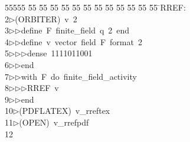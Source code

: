 %
%
\begin{tabbing}
55555 \= 55 \= 55 \= 55 \= 55 \= 55 \= 55 \= 55 \= 55 \= 55 \= 55 \= 55 \= 55 \= \>RREF:\\[0pt]
2\>$\triangleright$\>(ORBITER)\ v\ 2\ \\[0pt]
3\>$\triangleright$\>$\triangleright$\>define\ F\ finite\_field\ q\ 2\ end\ \\[0pt]
4\>$\triangleright$\>$\triangleright$\>define\ v\ vector\ field\ F\ format\ 2\ \\[0pt]
5\>$\triangleright$\>$\triangleright$\>$\triangleright$\>dense\ 1111011001\ \\[0pt]
6\>$\triangleright$\>$\triangleright$\>end\ \\[0pt]
7\>$\triangleright$\>$\triangleright$\>with\ F\ do\ finite\_field\_activity\ \\[0pt]
8\>$\triangleright$\>$\triangleright$\>$\triangleright$\>RREF\ v\ \\[0pt]
9\>$\triangleright$\>$\triangleright$\>end\\[0pt]
10\>$\triangleright$\>(PDFLATEX)\ v\_rreftex\\[0pt]
11\>$\triangleright$\>(OPEN)\ v\_rrefpdf\\[0pt]
12\>\end{tabbing}
